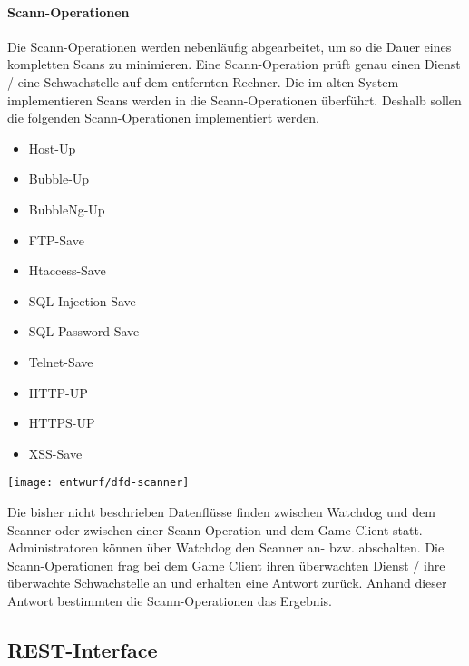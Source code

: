 \paragraph{Scann-Operationen}

Die Scann-Operationen werden nebenläufig abgearbeitet, um so die Dauer eines kompletten Scans zu minimieren. Eine Scann-Operation prüft genau einen Dienst / eine Schwachstelle auf dem entfernten Rechner. Die im alten System implementieren Scans werden in die Scann-Operationen überführt. Deshalb sollen die folgenden Scann-Operationen implementiert werden.

\begin{itemize}
	\item Host-Up
	\item Bubble-Up
	\item BubbleNg-Up
	\item FTP-Save
	\item Htaccess-Save
	\item SQL-Injection-Save
	\item SQL-Password-Save
	\item Telnet-Save
	\item HTTP-UP
	\item HTTPS-UP
	\item XSS-Save
\end{itemize}

\begin{center}
	\texttt{[image: entwurf/dfd-scanner]}
\end{center}

Die bisher nicht beschrieben Datenflüsse finden zwischen Watchdog und dem Scanner oder zwischen einer Scann-Operation und dem Game Client statt. Administratoren können über Watchdog den Scanner an- bzw. abschalten. Die Scann-Operationen frag bei dem Game Client ihren überwachten Dienst / ihre überwachte Schwachstelle an und erhalten eine Antwort zurück. Anhand dieser Antwort bestimmten die Scann-Operationen das Ergebnis.

\subsection{REST-Interface} \label{subsec:REST-Interface}